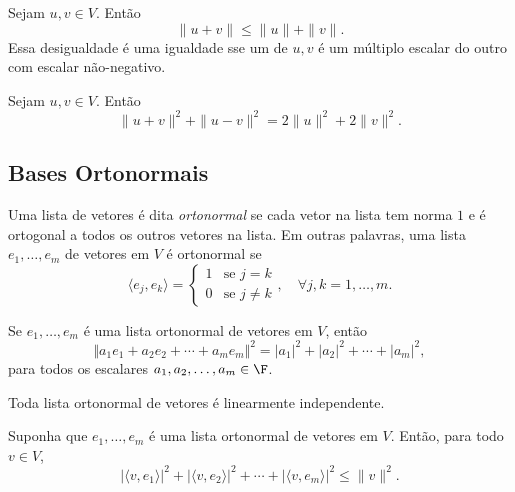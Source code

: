 \documentclass{article}
\begin{document}
\begin{cor} 
    Sejam \(u, v \in V\). Então
    \begin{equation}
        \|u + v\| \leq \|u\| + \|v\|.
    \end{equation}
    \noindent Essa desigualdade é uma igualdade sse um de \(u, v\) é um múltiplo escalar do outro com escalar não-negativo.
\end{cor}

\begin{cor} 
    Sejam \(u, v \in V\). Então
    \begin{equation}
        \|u + v\|^2 + \|u - v\|^2 = 2\|u\|^2 + 2\|v\|^2.
    \end{equation}
\end{cor}

\subsection{Bases Ortonormais}

\begin{defn}
    Uma lista de vetores é dita \emph{ortonormal} se cada vetor na lista tem norma \(1\) e é ortogonal a todos os outros vetores na lista.
    Em outras palavras, uma lista \(e_1, \ldots, e_m\) de vetores em \(V\) é ortonormal se
        \[
            \langle e_j, e_k \rangle = \begin{cases}
                1 & \text{se } j = k \\
                0 & \text{se } j \neq k
            \end{cases}, \quad \forall j,k = 1,\ldots,m. 
        \]
\end{defn}

\begin{prop}
    Se \(e_1, \ldots, e_m\) é uma lista ortonormal de vetores em \(V\), então
    \begin{equation}
        \Vert a_1 e_1 + a_2 e_2 + \cdots + a_m e_m\Vert^2 = |a_1|^2 + |a_2|^2 + \cdots + |a_m|^2,
    \end{equation}
    para todos os escalares \(a_1, a_2, \ldots, a_m \in \F\).
\end{prop}

\begin{cor}
    Toda lista ortonormal de vetores é linearmente independente.
\end{cor}

\begin{prop} 
    Suponha que \(e_1, \ldots, e_m\) é uma lista ortonormal de vetores em \(V\). Então, para todo \(v \in V\),
    \begin{equation}
        |\langle v, e_1 \rangle|^2 + |\langle v, e_2 \rangle|^2 + \cdots + |\langle v, e_m \rangle|^2 \leq \|v\|^2.
    \end{equation}
\end{prop}
\end{document}

